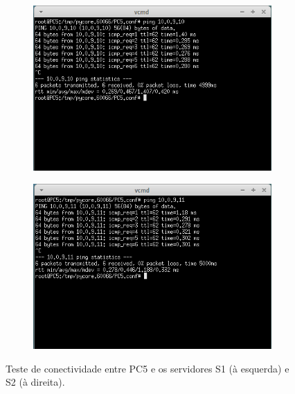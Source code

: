 \documentclass{llncs}
\begin{document}
\begin{figure}[h]
	\centering
	\begin{subfigure}{.5\textwidth}
		\centering
		\includegraphics[width=0.75\linewidth]{./imagens/PC5_S1.png}
	\end{subfigure}%
	\begin{subfigure}{.5\textwidth}
		\centering
		\includegraphics[width=0.75\linewidth]{./imagens/PC5_S2.png}
	\end{subfigure}
	\caption{Teste de conectividade entre PC5 e os servidores S1 (à esquerda) e S2 (à direita).}
	\label{fig:pc5_s}
\end{figure}
\end{document}
